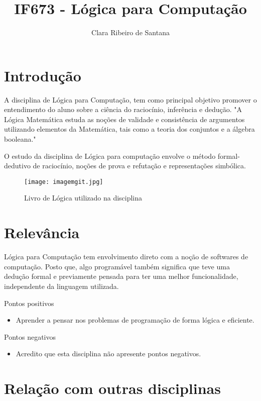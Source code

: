 \documentclass[10pt]{article}
\date{\vspace{-5ex}}
\title{IF673 - Lógica para Computação}
\author{Clara Ribeiro de Santana }
\begin{document}
\maketitle

\section{Introdução}
A disciplina de Lógica para Computação, tem como principal objetivo promover o entendimento do aluno sobre a ciência do raciocínio, inferência e dedução. "A Lógica Matemática estuda as noções de validade e consistência de argumentos utilizando elementos da Matemática, tais como a teoria dos conjuntos e a álgebra booleana." \citep{log}

O estudo da disciplina de Lógica para computação envolve o método formal-dedutivo de raciocínio, noções de prova e refutação e representações simbólica.

\begin{figure}[h!]
\centering
\texttt{[image: imagemgit.jpg]}
\caption{Livro de Lógica utilizado na disciplina}
\citep{livro1}
\label{fig:imagemgit}
\end{figure} 

\section{Relevância}
Lógica para Computação tem envolvimento direto com a noção de softwares de computação. Posto que, algo programável também significa que teve uma dedução formal e previamente pensada para ter uma melhor funcionalidade, independente da linguagem utilizada.

\newpage

Pontos positivos

\begin{itemize}
   \item Aprender a pensar nos problemas de programação de forma lógica e eficiente.
 \end{itemize}
Pontos negativos
\begin{itemize}
   \item Acredito que esta disciplina não apresente pontos negativos.
 \end{itemize}

\section{Relação com outras disciplinas}
\end{document}
